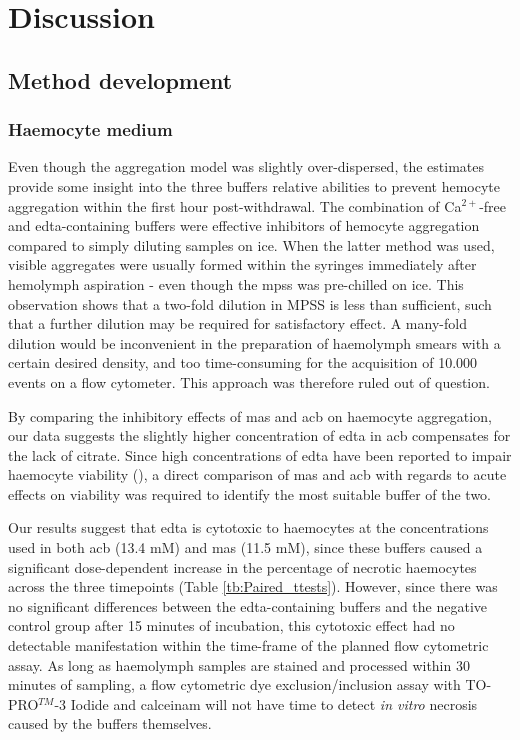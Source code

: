 \chapter{Discussion}
\label{chap:discuss}

\section{Method development}
\subsection{Haemocyte medium}
Even though the aggregation model was slightly over-dispersed, the estimates provide some insight into the three buffers relative abilities to prevent hemocyte aggregation within the first hour post-withdrawal. The combination of Ca$^{2+}$-free and \acrshort{edta}-containing buffers were effective inhibitors of hemocyte aggregation compared to simply diluting samples on ice. When the latter method was used, visible aggregates were usually formed within the syringes immediately after hemolymph aspiration - even though the \acrshort{mpss} was pre-chilled on ice. This observation shows that a two-fold dilution in MPSS is less than sufficient, such that a further dilution may be required for satisfactory effect. A many-fold dilution would be inconvenient in the preparation of haemolymph smears with a certain desired density, and too time-consuming for the acquisition of 10.000 events on a flow cytometer. This approach was therefore ruled out of question.

By comparing the inhibitory effects of \acrshort{mas} and \acrshort{acb} on haemocyte aggregation, our data suggests the slightly higher concentration of \acrshort{edta} in \acrshort{acb} compensates for the lack of citrate. Since high concentrations of \acrshort{edta} have been reported to impair haemocyte viability (\cite{Grandiosa2018, Burkhard2009}), a direct comparison of \acrshort{mas} and \acrshort{acb} with regards to acute effects on viability was required to identify the most suitable buffer of the two.

Our results suggest that \acrshort{edta} is cytotoxic to haemocytes at the concentrations used in both \acrshort{acb} (13.4 mM) and \acrshort{mas} (11.5 mM), since these buffers caused a significant dose-dependent increase in the percentage of necrotic haemocytes across the three timepoints (Table \ref{tb:Paired_ttests}). However, since there was no significant differences between the \acrshort{edta}-containing buffers and the negative control group after 15 minutes of incubation, this cytotoxic effect had no detectable manifestation within the time-frame of the planned flow cytometric assay. As long as haemolymph samples are stained and processed within 30 minutes of sampling, a flow cytometric dye exclusion/inclusion assay with TO-PRO$^{TM}$-3 Iodide and \acrshort{calceinam} will not have time to detect \emph{in vitro} necrosis caused by the buffers themselves.

